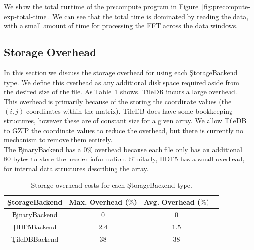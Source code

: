 We show the total runtime of the precompute program in
Figure~\ref{fig:precompute-exp-total-time}. We can see that the total time is
dominated by reading the data, with a small amount of time for processing the
FFT across the data windows.


\subsection{Storage Overhead}

In this section we discuss the storage overhead for using each
\c{StorageBackend} type. We define this overhead as any additional disk space
required aside from the desired size of the file. As
Table~\ref{table:storage-overhead} shows, TileDB incurs a large overhead. This
overhead is primarily because of the storing the coordinate values (the $(i,j)$
coordinates within the matrix). TileDB does have some bookkeeping structures,
however these are of constant size for a given array. We allow TileDB to GZIP
the coordinate values to reduce the overhead, but there is currently no
mechanism to remove them entirely. \\

The \c{BinaryBackend} has a $0\%$ overhead because each file only has an additional
80 bytes to store the header information. Similarly, HDF5 has a small overhead,
for internal data structures describing the array.

\begin{table}[h!]
\centering
 \begin{tabular}{|c |c |c |c|}
  \hline
  \c{StorageBackend} & Max. Overhead ($\%$) & Avg. Overhead ($\%$) \\
  \hline
  \c{BinaryBackend} & $0$ & $0$ \\
  \hline
  \c{HDF5Backend} & $2.4$ & $1.5$ \\
  \hline
  \c{TileDBBackend} & $38$ & $38$ \\
  \hline
\end{tabular}
\caption{Storage overhead costs for each \c{StorageBackend} type.}
\label{table:storage-overhead}
\end{table}

